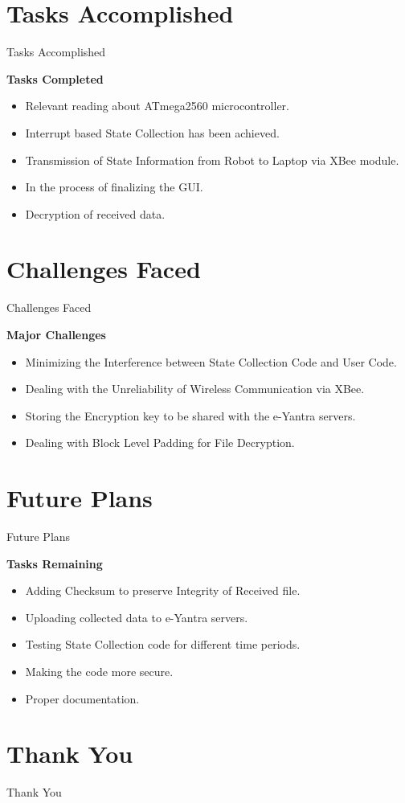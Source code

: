 \documentclass[10pt, a4paper]{beamer}
\begin{document}
\section{Tasks Accomplished}
\begin{frame}{Tasks Accomplished}
\begin{flushleft}
{\Large \bf Tasks Completed}\\
	\begin{itemize}
       \item Relevant reading about ATmega2560 microcontroller.
	   \item Interrupt based State Collection has been achieved.
       \item Transmission of State Information from Robot to Laptop via XBee module.
       \item In the process of finalizing the GUI.
       \item Decryption of received data.
\end{itemize}
\end{flushleft}
\end{frame}
\section{Challenges Faced}
\begin{frame}{Challenges Faced}
\begin{flushleft}
{\Large\bf Major Challenges}\\
	\begin{itemize}
       \item Minimizing the Interference between State Collection Code and User Code.
	   \item Dealing with the Unreliability of Wireless Communication via XBee.
        \item Storing the Encryption key to be shared with the e-Yantra servers.
       \item Dealing with Block Level Padding for File Decryption.
	\end{itemize}
\end{flushleft}
\end{frame}

\section{Future Plans}
\begin{frame}{Future Plans}
\begin{flushleft}
{\Large\bf Tasks Remaining}\\
	\begin{itemize}
        \item Adding Checksum to preserve Integrity of Received file.
        \item Uploading collected data to e-Yantra servers.
        \item Testing State Collection code for different time periods.
        \item Making the code more secure.
        \item Proper documentation.
	\end{itemize}
\end{flushleft}
\end{frame}


\section{Thank You}
\begin{frame}{Thank You}
\end{frame}
\end{document}
